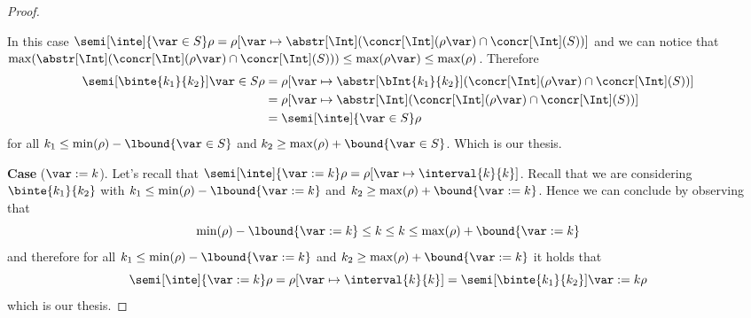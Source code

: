 \begin{proof}
\begin{enumerate}[label=(\arabic*)]
    \noindent
    In this case
    \({\semi[\inte]{\var \in S}\rho = \rho[\var \mapsto
      \abstr[\Int](\concr[\Int](\rho\var) \cap \concr[\Int](S))]}\) and
    we can notice that
    \(\max(\abstr[\Int](\concr[\Int](\rho\var) \cap \concr[\Int](S)))
    \leq \max(\rho\var) \leq \max(\rho)\). Therefore
    \begin{align*}
      \semi[\binte{k_1}{k_2}]{\var \in S}\rho & = \rho[\var \mapsto \abstr[\bInt{k_1}{k_2}](\concr[\Int](\rho\var) \cap \concr[\Int](S))] \\
                                              & = \rho[\var \mapsto \abstr[\Int](\concr[\Int](\rho\var) \cap \concr[\Int](S))] \\
                                              & = \semi[\inte]{\var\in S}\rho
    \end{align*}
    for all \(k_1 \leq \min(\rho) - \lbound{\var \in S}\) and
    \(k_2 \geq \max(\rho) + \bound{\var\in S}\). Which is our thesis.
  \end{enumerate}

  \medskip
  
  \noindent
  \textbf{Case} (\(\var := k\)).
  Let's recall that
  \({\semi[\inte]{\var := k}\rho = \rho[\var \mapsto \interval{k}{k}
    ]}\). Recall that we are considering \(\binte{k_1}{k_2}\) with
  \(k_1 \leq \min(\rho) - \lbound{\var := k}\) and
  \(k_2 \geq \max(\rho) + \bound{\var := k}\). Hence we can conclude by
  observing that
  \begin{equation*}
    \min(\rho) - \lbound{\var := k} \leq k \leq k \leq \max(\rho) + \bound{\var := k}
  \end{equation*}
  and therefore for all \(k_1 \leq \min(\rho) - \lbound{\var:=k}\) and
  \(k_2 \geq \max(\rho) + \bound{\var := k}\) it holds that
  \begin{equation*}
    \semi[\inte]{\var := k}\rho = \rho[\var \mapsto \interval{k}{k}] = \semi[\binte{k_1}{k_2}]{\var := k}\rho
  \end{equation*}
  which is our thesis.

  \medskip
  

\end{proof}
